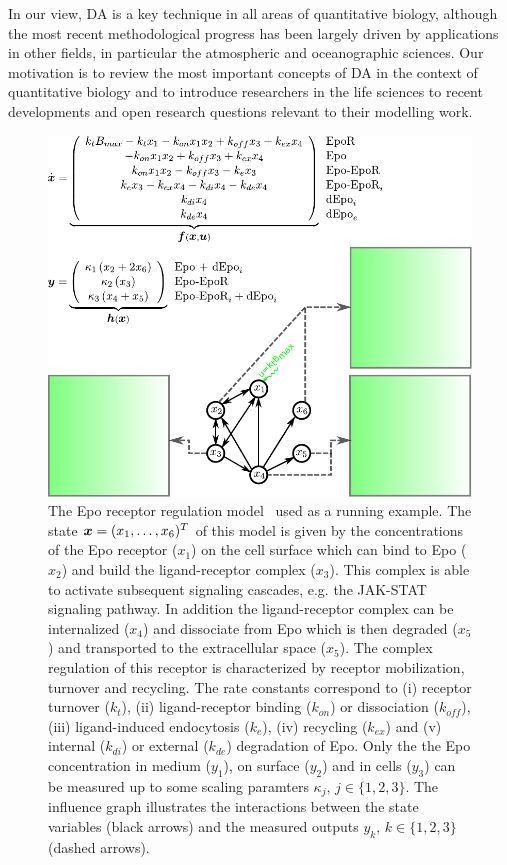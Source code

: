 \documentclass[10pt,a4paper, twocolumn]{article}
\renewcommand{\vec}[1]{{\mbox{\mathversion{bold}\ensuremath{#1}}}}
\begin{document}
In our view, DA is a key technique in all areas of quantitative biology, although the most recent methodological progress has been largely driven by applications in other fields, in particular the atmospheric and oceanographic sciences. Our motivation is to review the most important concepts of DA in the context of quantitative biology and to introduce researchers in the life sciences to recent developments and open research questions relevant to their modelling work. 
%
%
\begin{figure}[ht]\label{Fig1}
\includegraphics{Figs/Fig1-2.pdf}
\caption{The Epo receptor regulation model~\cite{becker_covering_2010} used as a running example. The state $\vec{x}=(x_1,\ldots,x_6)^T$ of this model is given by the concentrations of the Epo receptor ($x_1$) on the cell surface 
which can bind to Epo ($x_2$) and build the ligand-receptor complex ($x_3$). This complex is able to activate subsequent signaling cascades, e.g. the JAK-STAT signaling pathway. In addition the ligand-receptor complex can be internalized ($x_4$) and dissociate from Epo which is then degraded ($x_5$) and transported to the extracellular space ($x_5$).
The complex regulation of this receptor is characterized by receptor mobilization, turnover and recycling. The rate constants correspond to (i) receptor turnover ($k_t$), (ii) ligand-receptor binding ($k_{on}$) or dissociation ($k_{off}$), (iii) ligand-induced endocytosis ($k_e$), (iv) recycling ($k_{ex}$) and (v) internal ($k_{di}$) or external ($k_{de}$) degradation of Epo. Only the the Epo concentration in medium ($y_1$), on surface ($y_2$) and in cells ($y_3$) can be measured up to some scaling paramters $\kappa_j,\, j\in \{1,2,3\}$. The influence graph illustrates the interactions  between the state variables (black arrows) and the  measured outputs $y_k,\,k \in\{1,2,3\} $ (dashed arrows).}
\label{Fig1}
\end{figure}
%
%
\end{document}
